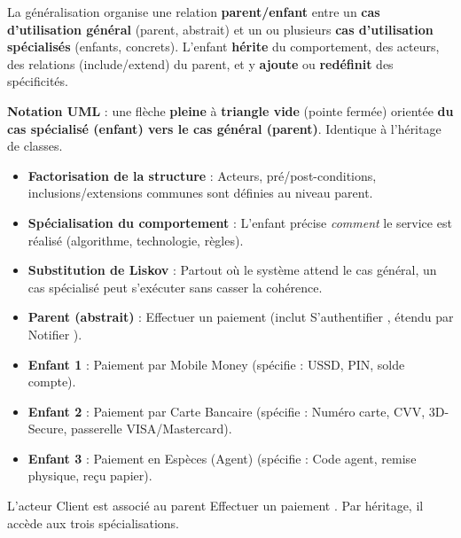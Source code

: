 \documentclass[11pt]{article}
\begin{document}
\begin{definition}
La généralisation organise une relation \textbf{parent/enfant} entre un \textbf{cas d'utilisation général} (parent, abstrait) et un ou plusieurs \textbf{cas d'utilisation spécialisés} (enfants, concrets). L'enfant \textbf{hérite} du comportement, des acteurs, des relations (include/extend) du parent, et y \textbf{ajoute} ou \textbf{redéfinit} des spécificités.

\textbf{Notation UML} : une flèche \textbf{pleine} à \textbf{triangle vide} (pointe fermée) orientée \textbf{du cas spécialisé (enfant) vers le cas général (parent)}. Identique à l'héritage de classes.
\end{definition}

\begin{propriete}
\begin{itemize}
    \item \textbf{Factorisation de la structure} : Acteurs, pré/post-conditions, inclusions/extensions communes sont définies au niveau parent.
    \item \textbf{Spécialisation du comportement} : L'enfant précise \emph{comment} le service est réalisé (algorithme, technologie, règles).
    \item \textbf{Substitution de Liskov} : Partout où le système attend le cas général, un cas spécialisé peut s'exécuter sans casser la cohérence.
\end{itemize}
\end{propriete}

\begin{exemplebox}
\begin{itemize}
    \item \textbf{Parent (abstrait)} : \guillemotleft Effectuer un paiement \guillemotright (inclut \guillemotleft S'authentifier \guillemotright, étendu par \guillemotleft Notifier \guillemotright).
    \item \textbf{Enfant 1} : \guillemotleft Paiement par Mobile Money \guillemotright (spécifie : USSD, PIN, solde compte).
    \item \textbf{Enfant 2} : \guillemotleft Paiement par Carte Bancaire \guillemotright (spécifie : Numéro carte, CVV, 3D-Secure, passerelle VISA/Mastercard).
    \item \textbf{Enfant 3} : \guillemotleft Paiement en Espèces (Agent) \guillemotright (spécifie : Code agent, remise physique, reçu papier).
\end{itemize}
L'acteur \guillemotleft Client \guillemotright est associé au parent \guillemotleft Effectuer un paiement \guillemotright. Par héritage, il accède aux trois spécialisations.
\end{exemplebox}
\end{document}
